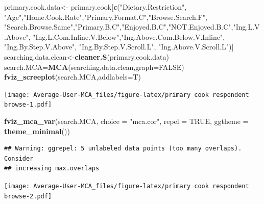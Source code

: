 \documentclass[
]{article}
\newenvironment{Shaded}{\begin{snugshade}}{\end{snugshade}}
\newcommand{\DataTypeTok}[1]{\textcolor[rgb]{0.13,0.29,0.53}{#1}}
\newcommand{\KeywordTok}[1]{\textcolor[rgb]{0.13,0.29,0.53}{\textbf{#1}}}
\newcommand{\NormalTok}[1]{#1}
\newcommand{\OtherTok}[1]{\textcolor[rgb]{0.56,0.35,0.01}{#1}}
\newcommand{\StringTok}[1]{\textcolor[rgb]{0.31,0.60,0.02}{#1}}
\begin{document}
\begin{Shaded}
\begin{Highlighting}[]
\NormalTok{primary.cook.data<-}\StringTok{ }\NormalTok{primary.cook[}\KeywordTok{c}\NormalTok{(}\StringTok{"Dietary.Restriction"}\NormalTok{, }\StringTok{"Age"}\NormalTok{,}\StringTok{"Home.Cook.Rate"}\NormalTok{,}\StringTok{"Primary.Format.C"}\NormalTok{,}\StringTok{"Browse.Search.F"}\NormalTok{,}
            \StringTok{"Search.Browse.Same"}\NormalTok{,}\StringTok{"Primary.B.C"}\NormalTok{,}\StringTok{"Enjoyed.B.C"}\NormalTok{,}\StringTok{"NOT.Enjoyed.B.C"}\NormalTok{,}\StringTok{"Ing.L.V.Above"}\NormalTok{,}
            \StringTok{"Ing.L.Com.Inline.V.Below"}\NormalTok{,}\StringTok{"Ing.Above.Com.Below.V.Inline"}\NormalTok{,  }\StringTok{"Ing.By.Step.V.Above"}\NormalTok{,  }\StringTok{"Ing.By.Step.V.Scroll.L"}\NormalTok{,}
            \StringTok{"Ing.Above.V.Scroll.L"}\NormalTok{)]}
\NormalTok{searching.data.clean<-}\KeywordTok{cleaner.S}\NormalTok{(primary.cook.data)}
\NormalTok{search.MCA=}\KeywordTok{MCA}\NormalTok{(searching.data.clean,}\DataTypeTok{graph=}\OtherTok{FALSE}\NormalTok{)}
\KeywordTok{fviz_screeplot}\NormalTok{(search.MCA,}\DataTypeTok{addlabels=}\NormalTok{T)}
\end{Highlighting}
\end{Shaded}

\texttt{[image: Average-User-MCA\_files/figure-latex/primary cook respondent browse-1.pdf]}

\begin{Shaded}
\begin{Highlighting}[]
\KeywordTok{fviz_mca_var}\NormalTok{(search.MCA, }\DataTypeTok{choice =} \StringTok{"mca.cor"}\NormalTok{, }\DataTypeTok{repel =} \OtherTok{TRUE}\NormalTok{,}
             \DataTypeTok{ggtheme =} \KeywordTok{theme_minimal}\NormalTok{())}
\end{Highlighting}
\end{Shaded}

\begin{verbatim}
## Warning: ggrepel: 5 unlabeled data points (too many overlaps). Consider
## increasing max.overlaps
\end{verbatim}

\texttt{[image: Average-User-MCA\_files/figure-latex/primary cook respondent browse-2.pdf]}

\begin{Shaded}
\end{Shaded}
\end{document}
